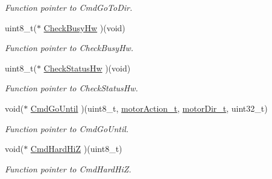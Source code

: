 \begin{DoxyCompactItemize}
\begin{DoxyCompactList}\small\item\em Function pointer to Cmd\+Go\+To\+Dir. \end{DoxyCompactList}\item 
\mbox{\label{structmotor_drv__t_a1065e8fcef030783b7c06ddb48936a32}} 
uint8\+\_\+t($\ast$ \mbox{\hyperlink{structmotor_drv__t_a1065e8fcef030783b7c06ddb48936a32}{Check\+Busy\+Hw}} )(void)
\begin{DoxyCompactList}\small\item\em Function pointer to Check\+Busy\+Hw. \end{DoxyCompactList}\item 
\mbox{\label{structmotor_drv__t_a77c472c4ede69df5e4ba48fe34b8d5c5}} 
uint8\+\_\+t($\ast$ \mbox{\hyperlink{structmotor_drv__t_a77c472c4ede69df5e4ba48fe34b8d5c5}{Check\+Status\+Hw}} )(void)
\begin{DoxyCompactList}\small\item\em Function pointer to Check\+Status\+Hw. \end{DoxyCompactList}\item 
\mbox{\label{structmotor_drv__t_a1c301ddbd943a7bf0e5329d77b859de4}} 
void($\ast$ \mbox{\hyperlink{structmotor_drv__t_a1c301ddbd943a7bf0e5329d77b859de4}{Cmd\+Go\+Until}} )(uint8\+\_\+t, \mbox{\hyperlink{group___device___action___options_ga5b2358a9ba8742cb555ddc5b37508500}{motor\+Action\+\_\+t}}, \mbox{\hyperlink{group___device___direction___options_ga4eaf4196e4d11d552f58f3fab218a8c7}{motor\+Dir\+\_\+t}}, uint32\+\_\+t)
\begin{DoxyCompactList}\small\item\em Function pointer to Cmd\+Go\+Until. \end{DoxyCompactList}\item 
\mbox{\label{structmotor_drv__t_a38392e414d628046ed909264a1505c90}} 
void($\ast$ \mbox{\hyperlink{structmotor_drv__t_a38392e414d628046ed909264a1505c90}{Cmd\+Hard\+HiZ}} )(uint8\+\_\+t)
\begin{DoxyCompactList}\small\item\em Function pointer to Cmd\+Hard\+HiZ. \end{DoxyCompactList}\item 
\mbox{\label{structmotor_drv__t_ada75b962899a05b4640740bcfe0a2fcf}} 

\end{DoxyCompactItemize}

